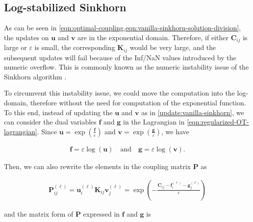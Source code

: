 \subsection{Log-stabilized Sinkhorn}\label{subsec:log-sinkhorn}

As can be seen in \cref{eqn:optimal-coupling,eqn:vanilla-sinkhorn-solution-division},
the updates on $\mathbf{u}$ and $\mathbf{v}$ are in the exponential domain.
Therefore, if either $\mathbf{C}_{ij}$ is large or $\varepsilon$ is small,
the corresponding $\mathbf{K}_{ij}$ would be very large,
and the subsequent updates will fail because of the Inf/NaN values introduced by the numeric overflow.
This is commonly known as the numeric instability issue of the Sinkhorn algorithm \citep[Chapter 4.4]{peyre2019}.

To circumvent this instability issue, we could move the computation into the log-domain,
therefore without the need for computation of the exponential function.
To this end, instead of updating the $\mathbf{u}$ and $\mathbf{v}$ as in \cref{update:vanilla-sinkhorn},
we can consider the dual variables $\mathbf{f}$ and $\mathbf{g}$ in the Lagrangian in \cref{eqn:regularized-OT-lagrangian}.
Since $\mathbf{u} = \exp \left(\frac{\mathbf{f}}{\varepsilon}\right)$
and $\mathbf{v} = \exp \left(\frac{\mathbf{g}}\varepsilon\right)$, we have

\begin{equation}\label{eqn:fg-expression-as-uv}
  \begin{aligned}
    \mathbf{f} = \varepsilon \log(\mathbf{u})
    \quad\text{and}\quad
    \mathbf{g} = \varepsilon \log(\mathbf{v}).
  \end{aligned}
\end{equation}

Then, we can also rewrite the elements in the coupling matrix $\mathbf{P}$ as

\begin{equation*}
  \begin{aligned}
    \mathbf{P}_{ij}^{(\ell)}
    = \mathbf{u}_i^{(\ell)} \mathbf{K}_{ij} \mathbf{v}_j^{(\ell)}
    = \exp \left(
    -\frac{\mathbf{C}_{ij} - \mathbf{f}^{(\ell)}_i - \mathbf{g}^{(\ell)}_j}{\varepsilon}
    \right)
  \end{aligned}
\end{equation*}

and the matrix form of $\mathbf{P}$ expressed in $\mathbf{f}$ and $\mathbf{g}$ is

